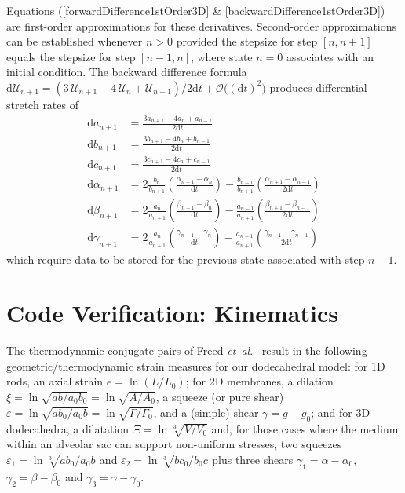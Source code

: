 Equations (\ref{forwardDifference1stOrder3D} \& \ref{backwardDifference1stOrder3D}) are first-order approximations for these derivatives.  Second-order approximations can be established whenever $n > 0$ provided the stepsize for step $[n, n+1]$ equals the stepsize for step $[n-1, n]$, where state $n=0$ associates with an initial condition.  The backward difference formula  $\mathrm{d} \boldsymbol{\mathcal{U}}_{n+1} = ( 3 \, \boldsymbol{\mathcal{U}}_{n+1} -  4 \, \boldsymbol{\mathcal{U}}_{n} + \boldsymbol{\mathcal{U}}_{n-1} ) / 2\mathrm{d}t + \mathcal{O} \bigl( ( \mathrm{d}t )^2 \bigr)$ produces differential stretch rates of
\begin{equation}
\begin{aligned}
\mathrm{d} a_{n+1} & 
= \frac {3a_{n+1} - 4a_{n} +  a_{n-1}}{2\mathrm{d}t} \\ 
\mathrm{d} b_{n+1} & 
= \frac {3b_{n+1} - 4b_{n} +  b_{n-1}}{2\mathrm{d}t} \\
\mathrm{d} c_{n+1} & 
= \frac {3c_{n+1} - 4c_{n} +  c_{n-1}}{2\mathrm{d}t} \\
\mathrm{d} \alpha_{n+1} & 
= 2 \frac{b_{n}} {b_{n+1}} \left( \frac{\alpha_{n+1} - \alpha_{n}}{\mathrm{d}t} \right) - \frac{b_{n-1}} {b_{n+1}} \left( \frac{\alpha_{n+1} - \alpha_{n-1}}{2\mathrm{d}t} \right) \\
\mathrm{d} \beta_{n+1} & 
= 2 \frac{a_{n}}{a_{n+1}} \left( \frac{\beta_{n+1} - \beta_{n} }{\mathrm{d}t} \right) - \frac{a_{n-1}} {a_{n+1}} \left( \frac{\beta_{n+1} - \beta_{n-1}}{2\mathrm{d}t} \right) \\ 
\mathrm{d} \gamma_{n+1} & 
= 2 \frac{a_{n}} {a_{n+1}} \left(\frac{\gamma_{n+1} - \gamma_{n}}{\mathrm{d}t} \right) - \frac{a_{n-1}}{a_{n+1}} \left( \frac{\gamma_{n+1} - \gamma_{n-1}}{2\mathrm{d}t} \right) 
\end{aligned}
\label{backwardDifference2ndOrder3D}
\end{equation}
which require data to be stored for the previous state associated with step $n-1$.

\section{Code Verification: Kinematics}
\label{sec:verification}

The thermodynamic conjugate pairs of Freed \textit{et~al}.\ \cite{Freed17,Freedetal17,FreedZamani19} result in the following geometric/thermo\-dynamic strain measures for our dodecahedral model: for 1D rods, an axial strain $e = \ln ( L / L_0 )$; for 2D membranes, a dilation $\xi = \ln \sqrt{ab/a_0b_0} = \ln \sqrt{A/A_0}$, a squeeze (or pure shear) $\varepsilon = \ln \sqrt{ab_0/a_0b} = \ln \sqrt{\Gamma / \Gamma_0}$, and a (simple) shear $\gamma = g - g_0$; and for 3D dodecahedra, a dilatation $\Xi = \ln \sqrt[3]{V \! / V_0}$ and, for those cases where the medium within an alveolar sac can support non-uniform stresses, two squeezes $\varepsilon_1 = \ln \sqrt[3]{a b_0 / a_0 b}$ and $\varepsilon_2 = \ln \sqrt[3]{b c_0 / b_0 c}$ plus three shears $\gamma_1 = \alpha - \alpha_0$, $\gamma_2 = \beta - \beta_0$ and $\gamma_3 = \gamma - \gamma_0$. 

